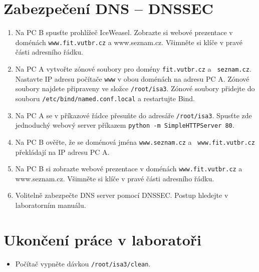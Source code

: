 \section{Zabezpečení DNS -- DNSSEC}

\begin{enumerate}
  \item Na PC B spusťte prohlížeč IceWeasel. Zobrazte si webové prezentace v
    doménách {\tt www.fit.vutbr.cz} a {www.seznam.cz}. Všimněte si klíče v pravé
    části adresního řádku.

  \item Na PC A vytvořte zónové soubory pro domény {\tt fit.vutbr.cz} a {\tt
    seznam.cz}. Nastavte IP adresu počítače {\tt www} v obou doménách na adresu
    PC A. Zónové soubory najdete připraveny ve složce {\tt /root/isa3}. Zónové
    soubory přidejte do souboru {\tt /etc/bind/named.conf.local} a restartujte
    Bind.

  \item Na PC A se v příkazové řádce přesuňte do adresáře {\tt /root/isa3}.
    Spusťte zde jednoduchý webový server příkazem {\tt python -m
    SimpleHTTPServer 80}.

  \item Na PC B ověřte, že se doménová jména {\tt www.seznam.cz} a {\tt
    www.fit.vutbr.cz} překládají na IP adresu PC A.

  \item Na PC B si zobrazte webové prezentace v doménách {\tt www.fit.vutbr.cz}
    a {www.seznam.cz}. Všimněte si klíče v pravé části adresního řádku.

  \item Volitelně zabezpečte DNS server pomocí DNSSEC. Postup hledejte v
    laboratorním manuálu.

\end{enumerate}

\section{Ukončení práce v laboratoři}
\begin{itemize}
  \item Počítač vypněte dávkou {\tt /root/isa3/clean}.
\end{itemize}
